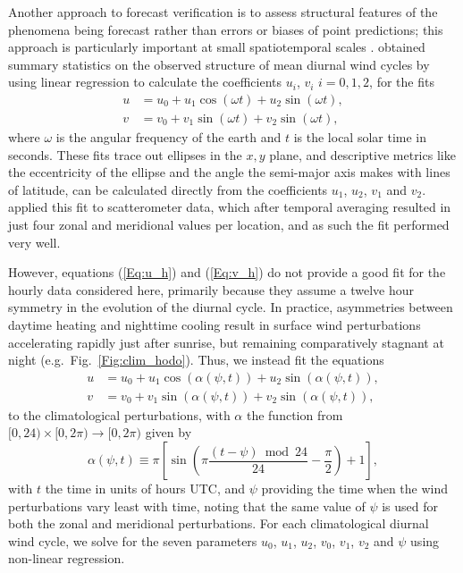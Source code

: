 \documentclass{ametsoc}
\begin{document}
Another approach to forecast verification is to assess structural features of the phenomena being forecast rather than errors or biases of point predictions; this approach is particularly important at small spatiotemporal scales \citep[e.g.][]{mass02, rife05}. \citet{gille05} obtained summary statistics on the observed structure of mean diurnal wind cycles by using linear regression to calculate the coefficients $u_i$, $v_i$ $i=0,1,2$, for the fits 
\begin{align}
u &= u_0 + u_1 \cos(\omega t) + u_2 \sin(\omega t), \label{Eq:u_h} \\
v &= v_0 + v_1 \sin(\omega t) + v_2 \sin(\omega t), \label{Eq:v_h}
\end{align}
where $\omega$ is the angular frequency of the earth and $t$ is the local solar time in seconds. These fits trace out ellipses in the $x,y$ plane, and descriptive metrics like the eccentricity of the ellipse and the angle the semi-major axis makes with lines of latitude, can be calculated directly from the coefficients $u_1$, $u_2$, $v_1$ and $v_2$. \citet{gille05} applied this fit to scatterometer data, which after temporal averaging resulted in just four zonal and meridional values per location, and as such the fit performed very well.  

However, equations (\ref{Eq:u_h}) and (\ref{Eq:v_h}) do not provide a good fit for the hourly data considered here, primarily because they assume a twelve hour symmetry in the evolution of the diurnal cycle. In practice, asymmetries between daytime heating and nighttime cooling \citep[e.g.][]{svensson11} result in surface wind perturbations accelerating rapidly just after sunrise, but remaining comparatively stagnant at night (e.g.~Fig.~\ref{Fig:clim_hodo}). Thus, we instead fit the equations
\begin{align}
u &= u_0 + u_1 \cos(\alpha(\psi,t)) + u_2 \sin(\alpha(\psi,t)), \label{Eq:u} \\
v &= v_0 + v_1 \sin(\alpha(\psi,t)) + v_2 \sin(\alpha(\psi,t)), \label{Eq:v}
\end{align}
to the climatological perturbations, with $\alpha$ the function from $[0,24) \times [0, 2\pi) \to [0, 2\pi)$ given by
\begin{equation}
\alpha(\psi,t) \equiv \pi \left[\sin\left( \pi \frac{(t - \psi)  \bmod 24}{24} - \frac{\pi}{2} \right) + 1 \right], \label{Eq:alpha}
\end{equation}
with $t$ the time in units of hours UTC, and $\psi$ providing the time when the wind perturbations vary least with time, noting that the same value of $\psi$ is used for both the zonal and meridional perturbations. For each climatological diurnal wind cycle, we solve for the seven parameters $u_0$, $u_1$, $u_2$, $v_0$, $v_1$, $v_2$ and $\psi$ using non-linear regression.
\end{document}
